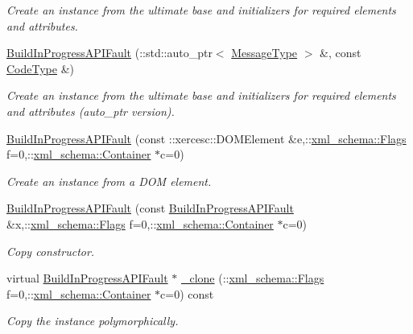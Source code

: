 \begin{DoxyCompactItemize}
\begin{DoxyCompactList}\small\item\em Create an instance from the ultimate base and initializers for required elements and attributes. \item\end{DoxyCompactList}\item 
\hyperlink{classopenstack_1_1xml_1_1BuildInProgressAPIFault_aa0f6df5e708c9bc9f37b49cd5dcb1a02}{BuildInProgressAPIFault} (::std::auto\_\-ptr$<$ \hyperlink{classopenstack_1_1xml_1_1CloudServersAPIFault_aff7b9d2067747fa033a0ea4408011af6}{MessageType} $>$ \&, const \hyperlink{classopenstack_1_1xml_1_1CloudServersAPIFault_aa9f350c9dba08ae375b2a61568551550}{CodeType} \&)
\begin{DoxyCompactList}\small\item\em Create an instance from the ultimate base and initializers for required elements and attributes (auto\_\-ptr version). \item\end{DoxyCompactList}\item 
\hyperlink{classopenstack_1_1xml_1_1BuildInProgressAPIFault_a7bb7ec1382f04fb5b49c26788d48a229}{BuildInProgressAPIFault} (const ::xercesc::DOMElement \&e,::\hyperlink{namespacexml__schema_affb4c227cbd9aa7453dd1dc5a1401943}{xml\_\-schema::Flags} f=0,::\hyperlink{namespacexml__schema_a333dea2213742aea47a37532dec4ec27}{xml\_\-schema::Container} $\ast$c=0)
\begin{DoxyCompactList}\small\item\em Create an instance from a DOM element. \item\end{DoxyCompactList}\item 
\hyperlink{classopenstack_1_1xml_1_1BuildInProgressAPIFault_a2b9f1628d2c24c282f45a3364c066b88}{BuildInProgressAPIFault} (const \hyperlink{classopenstack_1_1xml_1_1BuildInProgressAPIFault}{BuildInProgressAPIFault} \&x,::\hyperlink{namespacexml__schema_affb4c227cbd9aa7453dd1dc5a1401943}{xml\_\-schema::Flags} f=0,::\hyperlink{namespacexml__schema_a333dea2213742aea47a37532dec4ec27}{xml\_\-schema::Container} $\ast$c=0)
\begin{DoxyCompactList}\small\item\em Copy constructor. \item\end{DoxyCompactList}\item 
virtual \hyperlink{classopenstack_1_1xml_1_1BuildInProgressAPIFault}{BuildInProgressAPIFault} $\ast$ \hyperlink{classopenstack_1_1xml_1_1BuildInProgressAPIFault_ac383690d201cd3847662e36172a0ce1c}{\_\-clone} (::\hyperlink{namespacexml__schema_affb4c227cbd9aa7453dd1dc5a1401943}{xml\_\-schema::Flags} f=0,::\hyperlink{namespacexml__schema_a333dea2213742aea47a37532dec4ec27}{xml\_\-schema::Container} $\ast$c=0) const 
\begin{DoxyCompactList}\small\item\em Copy the instance polymorphically. \item\end{DoxyCompactList}\end{DoxyCompactItemize}


